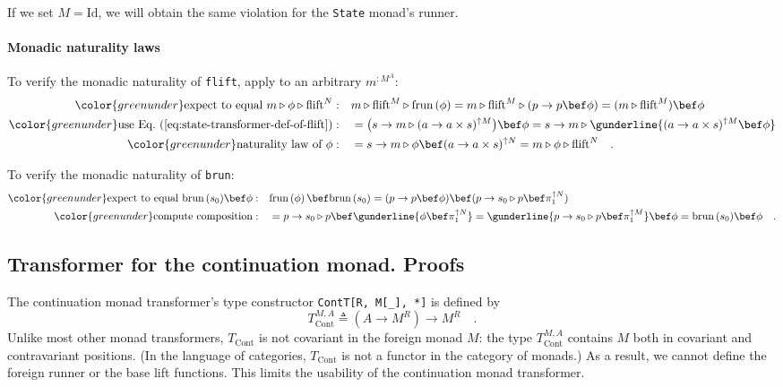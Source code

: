 If we set $M=\text{Id}$, we will obtain the same violation for the
\lstinline!State! monad\textsf{'}s runner.

\paragraph{Monadic naturality laws}

To verify the monadic naturality of \lstinline!flift!, apply to an
arbitrary $m^{:M^{A}}$:
\begin{align*}
{\color{greenunder}\text{expect to equal }m\triangleright\phi\triangleright\text{flift}^{N}:}\quad & m\triangleright\text{flift}^{M}\triangleright\text{frun}\left(\phi\right)=m\triangleright\text{flift}^{M}\triangleright(p\rightarrow p\bef\phi)=(m\triangleright\text{flift}^{M})\bef\phi\\
{\color{greenunder}\text{use Eq.~(\ref{eq:state-transformer-def-of-flift})}:}\quad & =\big(s\rightarrow m\triangleright(a\rightarrow a\times s)^{\uparrow M}\big)\bef\phi=s\rightarrow m\triangleright\gunderline{(a\rightarrow a\times s)^{\uparrow M}\bef\phi}\\
{\color{greenunder}\text{naturality law of }\phi:}\quad & =s\rightarrow m\triangleright\phi\bef(a\rightarrow a\times s)^{\uparrow N}=m\triangleright\phi\triangleright\text{flift}^{N}\quad.
\end{align*}

To verify the monadic naturality of \lstinline!brun!:
\begin{align*}
{\color{greenunder}\text{expect to equal }\text{brun}\,(s_{0})\bef\phi:}\quad & \text{frun}\left(\phi\right)\bef\text{brun}\,(s_{0})=(p\rightarrow p\bef\phi)\bef(p\rightarrow s_{0}\triangleright p\bef\pi_{1}^{\uparrow N})\\
{\color{greenunder}\text{compute composition}:}\quad & =p\rightarrow s_{0}\triangleright p\bef\gunderline{\phi\bef\pi_{1}^{\uparrow N}}=\gunderline{p\rightarrow s_{0}\triangleright p\bef\pi_{1}^{\uparrow M}}\bef\phi=\text{brun}\,(s_{0})\bef\phi\quad.
\end{align*}


\subsection{Transformer for the continuation monad. Proofs}

The continuation monad transformer\textsf{'}s type constructor \lstinline!ContT[R, M[_], *]!
is defined by
\[
T_{\text{Cont}}^{M,A}\triangleq(A\rightarrow M^{R})\rightarrow M^{R}\quad.
\]
Unlike most other monad transformers, $T_{\text{Cont}}$ is not covariant
in the foreign monad $M$: the type $T_{\text{Cont}}^{M,A}$ contains
$M$ both in covariant and contravariant positions. (In the language
of categories, $T_{\text{Cont}}$ is not a functor in the category
of monads.) As a result, we cannot define the foreign runner or the
base lift functions. This limits the usability of the continuation
monad transformer. 

